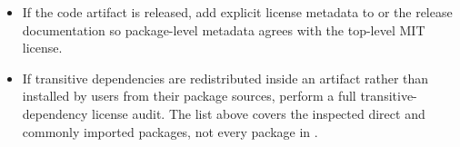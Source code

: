 \begin{itemize}
  \item If the code artifact is released, add explicit license metadata to
   or the release documentation so package-level metadata
  agrees with the top-level MIT license.

  \item If transitive dependencies are redistributed inside an artifact rather
  than installed by users from their package sources, perform a full
  transitive-dependency license audit. The list above covers the inspected
  direct and commonly imported packages, not every package in .
\end{itemize}

